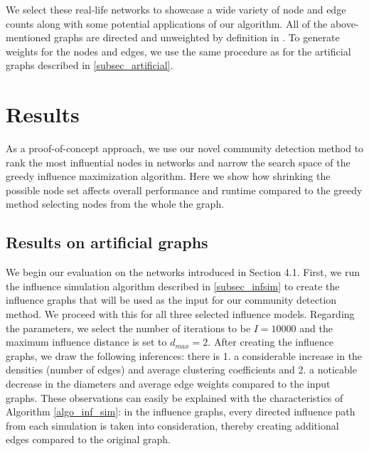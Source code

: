 \documentclass[pdflatex,sn-mathphys-ay]{sn-jnl}
\begin{document}
We select these real-life networks to showcase a wide variety of node and edge counts along with some potential applications of our algorithm. All of the above-mentioned graphs are directed and unweighted by definition in \citep{stanfordlarge}. To generate weights for the nodes and edges, we use the same procedure as for the artificial graphs described in \ref{subsec_artificial}.


\section{Results}\label{sec_results}

As a proof-of-concept approach, we use our novel community detection method to rank the most influential nodes in networks and narrow the search space of the greedy influence maximization algorithm. Here we show how shrinking the possible node set affects overall performance and runtime compared to the greedy method selecting nodes from the whole the graph.


\subsection{Results on artificial graphs}\label{subsec_res_artificial}

We begin our evaluation on the networks introduced in Section 4.1. First, we run the influence simulation algorithm described in \ref{subsec_infsim} to create the influence graphs that will be used as the input for our community detection method. We proceed with this for all three selected influence models. Regarding the parameters, we select the number of iterations to be $I = 10000$ and the maximum influence distance is set to $d_{max} = 2$. After creating the influence graphs, we draw the following inferences: there is 1. a considerable increase in the densities (number of edges) and average clustering coefficients and 2. a noticable decrease in the diameters and average edge weights compared to the input graphs. These observations can easily be explained with the characteristics of Algorithm \ref{algo_inf_sim}: in the influence graphs, every directed influence path from each simulation is taken into consideration, thereby creating additional edges compared to the original graph.
\end{document}
